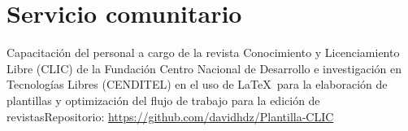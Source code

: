 \documentclass[11pt,letterpaper,sans]{moderncv}   %
\begin{document}

\section{Servicio comunitario}
{Capacitación del personal a cargo de la revista Conocimiento y Licenciamiento Libre (CLIC) de la Fundación Centro Nacional de Desarrollo e investigación en Tecnologías Libres (CENDITEL) en el uso de \LaTeX\ para la elaboración de plantillas y optimización del flujo de trabajo para la edición de revistas}{}{Repositorio: \url{https://github.com/davidhdz/Plantilla-CLIC}}
\end{document}
